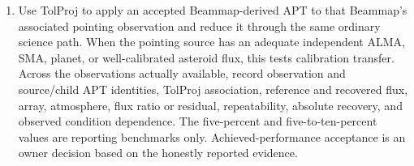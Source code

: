 \begin{enumerate}[label=\textbf{V\arabic*.},leftmargin=*]
\item {} Use TolProj to apply an
  accepted Beammap-derived APT to that Beammap's associated pointing
  observation and reduce it through the same ordinary science path. When the
  pointing source has an adequate independent ALMA, SMA, planet, or
  well-calibrated asteroid flux, this tests calibration transfer. Across the
  observations actually available, record observation and source/child APT
  identities, TolProj association, reference and recovered flux, array,
  atmosphere, flux ratio or residual, repeatability, absolute recovery, and
  observed condition dependence. The five-percent and five-to-ten-percent
  values are reporting benchmarks only. Achieved-performance acceptance is an
  owner decision based on the honestly reported evidence.
\end{enumerate}

